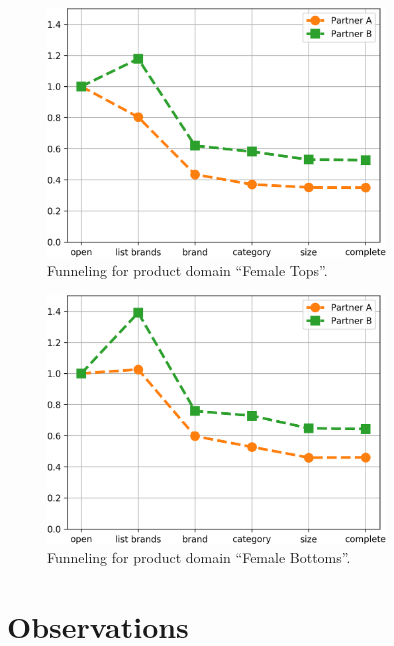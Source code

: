 \documentclass[12pt,a4paper]{article}
\begin{document}
    \begin{figure}[p]
        \centering
        \includegraphics[width=0.8\textwidth]{../py/OUTPUT/funnel/img/product=Female_Tops.png}
        \caption{Funneling for product domain ``Female Tops''.}
        \label{f:pd_tops}
    \end{figure}
    
    \begin{figure}[p]
        \centering
        \includegraphics[width=0.8\textwidth]{../py/OUTPUT/funnel/img/product=Female_Bottoms.png}
        \caption{Funneling for product domain ``Female Bottoms''.}
        \label{f:pd_bottoms}
    \end{figure}
    
    
    \clearpage
    
    \section{Observations}
    
\end{document}
